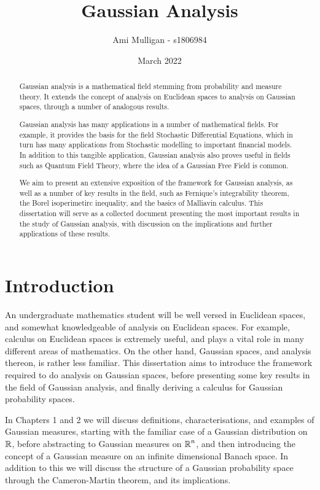 \documentclass[12pt]{report}
\title{Gaussian Analysis}
\author{Ami Mulligan - s1806984}
\date{March 2022}
\begin{document}
\maketitle
\begin{abstract}
Gaussian analysis is a mathematical field stemming from probability and measure theory. It extends the concept of analysis on Euclidean spaces to analysis on Gaussian spaces, through a number of analogous results. 

Gaussian analysis has many applications in a number of mathematical fields. For example, it provides the basis for the field Stochastic Differential Equations, which in turn has many applications from Stochastic modelling to important financial models. In addition to this tangible application, Gaussian analysis also proves useful in fields such as Quantum Field Theory, where the idea of a Gaussian Free Field is common.

We aim to present an extensive exposition of the framework for Gaussian analysis, as well as a number of key results in the field, such as Fernique's integrability theorem, the Borel isoperimetirc inequality, and the basics of Malliavin calculus. This dissertation will serve as a collected document presenting the most important results in the study of Gaussian analysis, with discussion on the implications and further applications of these results.
\end{abstract}
\declaration
\dedication{I would like to thank Ilya Chevyerev for all the help that he has provided throughout the course of this dissertation, from research to writing.}
\tableofcontents
\newpage
{}

\chapter*{Introduction}
An undergraduate mathematics student will be well versed in Euclidean spaces, and somewhat knowledgeable of analysis on Euclidean spaces. For example, calculus on Euclidean spaces is extremely useful, and plays a vital role in many different areas of mathematics. On the other hand, Gaussian spaces, and analysis thereon, is rather less familiar. This dissertation aims to introduce the framework required to do analysis on Gaussian spaces, before presenting some key results in the field of Gaussian analysis, and finally deriving a calculus for Gaussian probability spaces. 

In Chapters 1 and 2 we will discuss definitions, characterisations, and examples of Gaussian measures, starting with the familiar case of a Gaussian distribution on $\operatorname{\mathbb{R}}$, before abstracting to Gaussian measures on $\operatorname{\mathbb{R}}^n$, and then introducing the concept of a Gaussian measure on an infinite dimensional Banach space. In addition to this we will discuss the structure of a Gaussian probability space through the Cameron-Martin theorem, and its implications.
\end{document}
